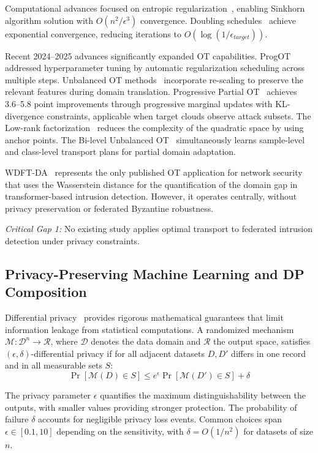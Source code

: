 \documentclass{ieeeaccess}
\theoremstyle{plain}
\theoremstyle{definition}
\theoremstyle{remark}
\begin{document}
Computational advances focused on entropic regularization~\cite{cuturi2013}, enabling Sinkhorn algorithm solution with $O(n^2/\epsilon^3)$ convergence. Doubling schedules~\cite{altschuler2017} achieve exponential convergence, reducing iterations to $O(\log(1/\epsilon_{target}))$.

Recent 2024--2025 advances significantly expanded OT capabilities. ProgOT~\cite{kassraie2024} addressed hyperparameter tuning by automatic regularization scheduling across multiple steps. Unbalanced OT methods~\cite{eyring2024} incorporate re-scaling to preserve the relevant features during domain translation. Progressive Partial OT~\cite{zhang2024} achieves 3.6--5.8 point improvements through progressive marginal updates with KL-divergence constraints, applicable when target clouds observe attack subsets. The Low-rank factorization~\cite{scetbon2024} reduces the complexity of the quadratic space by using anchor points. The Bi-level Unbalanced OT~\cite{chen2025} simultaneously learns sample-level and class-level transport plans for partial domain adaptation.

WDFT-DA~\cite{rasheed2022} represents the only published OT application for network security that uses the Wasserstein distance for the quantification of the domain gap in transformer-based intrusion detection. However, it operates centrally, without privacy preservation or federated Byzantine robustness.

\textit{Critical Gap 1:} No existing study applies optimal transport to federated intrusion detection under privacy constraints.

\subsection{Privacy-Preserving Machine Learning and DP Composition}

Differential privacy~\cite{dwork2006,dwork2014} provides rigorous mathematical guarantees that limit information leakage from statistical computations. A randomized mechanism $\mathcal{M}: \mathcal{D}^n \to \mathcal{R}$, where $\mathcal{D}$ denotes the data domain and $\mathcal{R}$ the output space, satisfies $(\epsilon, \delta)$-differential privacy if for all adjacent datasets $D, D'$ differs in one record and in all measurable sets $S$:
\begin{equation}
\Pr[\mathcal{M}(D) \in S] \leq e^\epsilon \Pr[\mathcal{M}(D') \in S] + \delta
\end{equation}

The privacy parameter $\epsilon$ quantifies the maximum distinguishability between the outputs, with smaller values providing stronger protection. The probability of failure $\delta$ accounts for negligible privacy loss events. Common choices span $\epsilon \in [0.1, 10]$ depending on the sensitivity, with $\delta = O(1/n^2)$ for datasets of size $n$.
\end{document}
